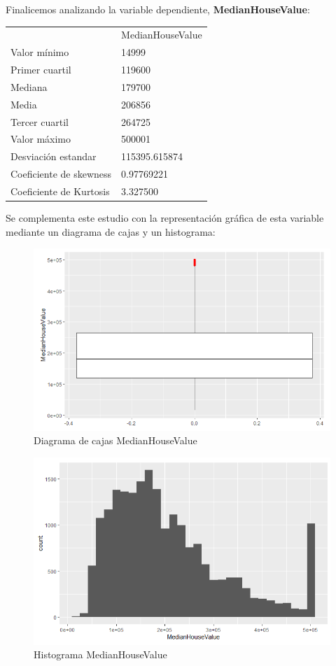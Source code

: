 Finalicemos analizando la variable dependiente, \textbf{MedianHouseValue}:
\begin{table}[h!]
	\centering
	\begin{tabular}{ll}
		& MedianHouseValue \\
		Valor mínimo            & 14999            \\
		Primer cuartil          & 119600           \\
		Mediana                 & 179700           \\
		Media                   & 206856           \\
		Tercer cuartil          & 264725           \\
		Valor máximo            & 500001           \\ \hline
		Desviación estandar     & 115395.615874    \\ \hline
		Coeficiente de skewness & 0.97769221       \\
		Coeficiente de Kurtosis & 3.327500        
	\end{tabular}
\end{table}

Se complementa este estudio con la representación gráfica de esta variable mediante un diagrama de cajas y un histograma:
\newpage

\begin{figure}[h!]
	\centering
	\includegraphics[width=0.7\linewidth]{figures/eda_box_9}
	\caption{Diagrama de cajas MedianHouseValue}
	\label{fig:edabox9}
\end{figure}
\begin{figure}[h!]
	\centering
	\includegraphics[width=0.7\linewidth]{figures/eda_hist_9}
	\caption{Histograma MedianHouseValue}
	\label{fig:edahist9}
\end{figure}

